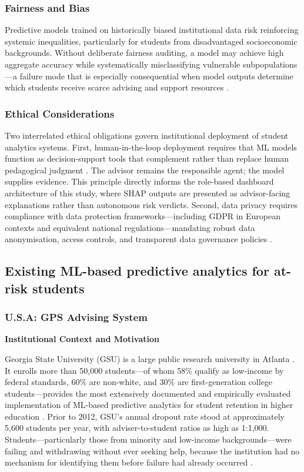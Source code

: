 \documentclass[12pt]{report}
\begin{document}
\subsubsection{Fairness and Bias}
Predictive models trained on historically biased institutional data
risk reinforcing systemic inequalities, particularly for students from
disadvantaged socioeconomic backgrounds. Without deliberate fairness
auditing, a model may achieve high aggregate accuracy while
systematically misclassifying vulnerable subpopulations---a failure
mode that is especially consequential when model outputs determine
which students receive scarce advising and support resources
\parencite{bello2025}.

\subsubsection{Ethical Considerations}
Two interrelated ethical obligations govern institutional deployment
of student analytics systems. First, human-in-the-loop
deployment requires that ML models function as decision-support
tools that complement rather than replace human pedagogical judgment
\parencite{kwakye2025}. The advisor remains the responsible agent; the
model supplies evidence. This principle directly informs the role-based
dashboard architecture of this study, where SHAP outputs are presented
as advisor-facing explanations rather than autonomous risk verdicts.
Second, data privacy requires compliance with data protection
frameworks---including GDPR in European contexts and equivalent national
regulations---mandating robust data anonymisation, access controls, and
transparent data governance policies \parencite{kwakye2025}.

\subsection{Existing ML-based predictive analytics for at-risk students}

\subsubsection{U.S.A: GPS Advising System}

\textbf{Institutional Context and Motivation}

Georgia State University (GSU) is a large public research university in
Atlanta \parencite{GSU2024}. It enrolls more than 50,000 students---of whom 58\%
qualify as low-income by federal standards, 60\% are non-white, and 30\%
are first-generation college students---provides the most extensively
documented and empirically evaluated implementation of ML-based predictive
analytics for student retention in higher education
\parencite{GSU2024, Renick2017}. Prior to 2012, GSU's annual dropout rate
stood at approximately 5,600 students per year, with adviser-to-student
ratios as high as 1:1,000. Students---particularly those from minority and
low-income backgrounds---were failing and withdrawing without ever seeking
help, because the institution had no mechanism for identifying them before
failure had already occurred \parencite{NPR2016}.
\end{document}
